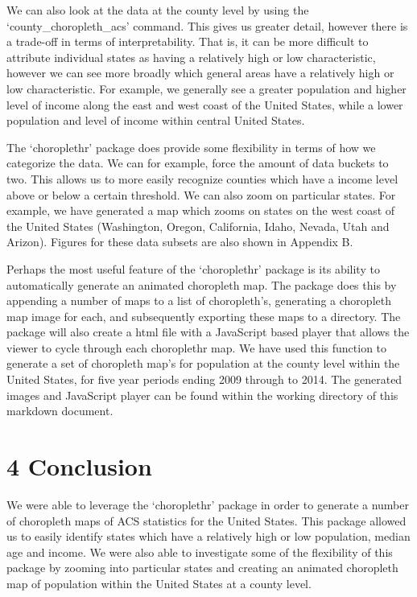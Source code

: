 \documentclass[]{article}
\begin{document}
We can also look at the data at the county level by using the
`county\_choropleth\_acs' command. This gives us greater detail, however
there is a trade-off in terms of interpretability. That is, it can be
more difficult to attribute individual states as having a relatively
high or low characteristic, however we can see more broadly which
general areas have a relatively high or low characteristic. For example,
we generally see a greater population and higher level of income along
the east and west coast of the United States, while a lower population
and level of income within central United States.

The `choroplethr' package does provide some flexibility in terms of how
we categorize the data. We can for example, force the amount of data
buckets to two. This allows us to more easily recognize counties which
have a income level above or below a certain threshold. We can also zoom
on particular states. For example, we have generated a map which zooms
on states on the west coast of the United States (Washington, Oregon,
California, Idaho, Nevada, Utah and Arizon). Figures for these data
subsets are also shown in Appendix B.

Perhaps the most useful feature of the `choroplethr' package is its
ability to automatically generate an animated choropleth map. The
package does this by appending a number of maps to a list of
choropleth's, generating a choropleth map image for each, and
subsequently exporting these maps to a directory. The package will also
create a html file with a JavaScript based player that allows the viewer
to cycle through each choroplethr map. We have used this function to
generate a set of choropleth map's for population at the county level
within the United States, for five year periods ending 2009 through to
2014. The generated images and JavaScript player can be found within the
working directory of this markdown document.

\section{4 Conclusion}\label{conclusion}

We were able to leverage the `choroplethr' package in order to generate
a number of choropleth maps of ACS statistics for the United States.
This package allowed us to easily identify states which have a
relatively high or low population, median age and income. We were also
able to investigate some of the flexibility of this package by zooming
into particular states and creating an animated choropleth map of
population within the United States at a county level.
\end{document}
